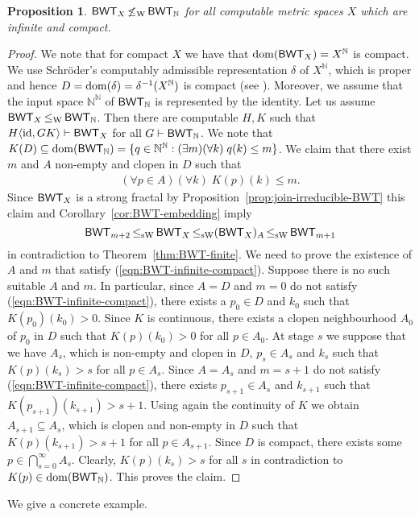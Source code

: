 \documentclass[a4paper]{amsart}
\def\IN{{\mathbb{N}}}
\def\In{\subseteq}
\def\id{{\rm id}}
\def\dom{{\rm dom}}
\def\Baire{{\IN^\IN}}
\def\BWT{\text{\rm\sffamily BWT}}
\def\leqW{\mathop{\leq_{\mathrm{W}}}}
\def\leqSW{\mathop{\leq_{\mathrm{sW}}}}
\def\nleqW{\mathop{\not\leq_{\mathrm{W}}}}
\newtheorem{proposition}[theorem]{Proposition}
\theoremstyle{definition}
\begin{document}
\begin{proposition}
\label{prop:BWT-infinite-compact}
$\BWT_X\nleqW\BWT_\IN$ 
for all computable metric spaces $X$ which  are infinite and compact.
\end{proposition}
\begin{proof}
We note that for compact $X$ we have that $\dom(\BWT_X)=X^\IN$ is compact. 
We use Schr\"oder's computably admissible representation $\delta$ of $X^\IN$, 
which is proper and hence $D=\dom(\delta)=\delta^{-1}(X^\IN)$ is compact (see \cite{Wei03}). 
Moreover, we assume that the input space $\IN^\IN$ of $\BWT_\IN$ is represented by the identity.
Let us assume $\BWT_X\leqW\BWT_\IN$. Then there are computable
$H,K$ such that $H\langle\id,GK\rangle\vdash\BWT_X$ for all $G\vdash\BWT_\IN$.
We note that $K(D)\In\dom(\BWT_\IN)=\{q\in\Baire:(\exists m)(\forall k)\;q(k)\leq m\}$.
We claim that there exist $m$ and $A$ non-empty and clopen in $D$ such that
\begin{eqnarray}
(\forall p\in A)(\forall k)\; K(p)(k)\leq m.
\label{eqn:BWT-infinite-compact}
\end{eqnarray}
Since $\BWT_X$ is a strong fractal by Proposition~\ref{prop:join-irreducible-BWT} this claim and Corollary~\ref{cor:BWT-embedding}
imply 
\[\BWT_{m+2}\leqSW\BWT_X\leqSW(\BWT_X)_A\leqSW\BWT_{m+1}\]
in contradiction to Theorem~\ref{thm:BWT-finite}. We need to prove the existence of $A$ and $m$ that 
satisfy (\ref{eqn:BWT-infinite-compact}).
Suppose there is no such suitable $A$ and $m$. 
In particular, since $A=D$ and $m=0$ do not satisfy (\ref{eqn:BWT-infinite-compact}), there exists a $p_0\in D$ and $k_0$
such that $K(p_0)(k_0)>0$. Since $K$ is continuous, there exists a clopen neighbourhood $A_0$ of $p_0$
in $D$ such that $K(p)(k_0)>0$ for all $p\in A_0$. 
At stage $s$ we suppose that we have $A_s$, which is non-empty and clopen in $D$, $p_s\in A_s$
and $k_s$ such that $K(p)(k_s)>s$ for all $p\in A_s$. Since $A=A_s$ and $m=s+1$ do not satisfy
(\ref{eqn:BWT-infinite-compact}), there exists $p_{s+1}\in A_s$ and $k_{s+1}$ such that
$K(p_{s+1})(k_{s+1})>s+1$. Using again the continuity of $K$ we obtain $A_{s+1}\In A_s$, which is
clopen and non-empty in $D$ 
such that $K(p)(k_{s+1})>s+1$ 
for all $p\in A_{s+1}$. Since $D$ is compact, there exists some $p\in\bigcap_{s=0}^\infty A_s$.
Clearly, $K(p)(k_s)>s$ for all $s$ in contradiction to $K(p)\in\dom(\BWT_\IN)$. 
This proves the claim.
\end{proof}

We give a concrete example.
\end{document}
